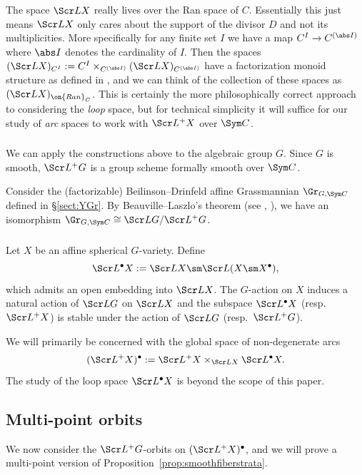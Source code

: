 \begin{rem}
\notready
The space $\Scr L X$ really lives over
the Ran space of $C$. Essentially this just means $\Scr L X$
only cares about the support of the divisor $D$ and not its multiplicities.
More specifically for any finite set $I$ we have a map
$C^I \to C^{(\abs I)}$ where $\abs I$ denotes the cardinality of $I$.
Then the spaces $(\Scr L X)_{C^I} := C^I \times_{C^{(\abs I)}} (\Scr L X)_{C^{(\abs I)}}$
have a factorization monoid structure as
defined in \cite[Definition 2.2.1]{KV}, and we can think
of the collection of these spaces as $(\Scr L X)_{\on{Ran}_C}$.
This is certainly the more philosophically correct approach to
considering the \emph{loop} space, but for technical simplicity
it will suffice for our study of \emph{arc} spaces to work with $\Scr L^+ X$
over $\Sym C$.
\end{rem}

\subsubsection{} \label{sect:localGr}
We can apply the constructions above to the algebraic group $G$.
Since $G$ is smooth, $\Scr L^+ G$ is a group scheme formally smooth over
$\Sym C$.

Consider the (factorizable) Beilinson--Drinfeld affine Grassmannian $\Gr_{G,\Sym C}$ defined in \S\ref{sect:YGr}.
By Beauville--Laszlo's theorem (see \cite[Remark 2.3.7]{BD}, \cite[Proposition 3.1.9]{Xinwen}), we have an isomorphism
$ \Gr_{G,\Sym C} \cong \Scr L G / \Scr L^+ G$.


\subsubsection{} Let $X$ be an affine spherical
$G$-variety. Define
\[
    \Scr L^\bullet X := \Scr L X \sm \Scr L(X\sm X^\bullet),
\]
which admits an open embedding into $\Scr L X$.
The $G$-action on $X$ induces a natural action of $\Scr L G$ on
$\Scr L X$ and the subspace $\Scr L^\bullet X$ (resp.~$\Scr L^+ X$) is stable under the action of
$\Scr L G$ (resp.~$\Scr L^+ G$).

We will primarily be concerned with the global space of
non-degenerate arcs
\[ (\Scr L^+X)^\bullet := \Scr L^+X \times_{\Scr L X} \Scr L^\bullet X.\]
The study of the loop space $\Scr L^\bullet X$ is beyond the scope of
this paper.


\subsection{Multi-point orbits} \label{sect:defstrata}
We now consider the $\Scr L^+G$-orbits on $(\Scr L^+X)^\bullet$, and
we will prove a multi-point version of Proposition~\ref{prop:smoothfiberstrata}.

